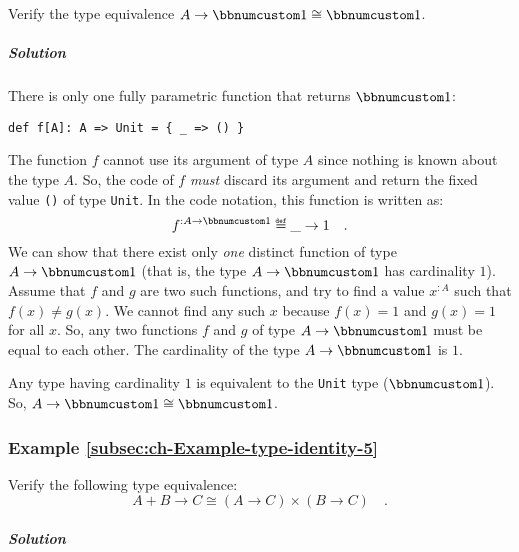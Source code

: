 Verify the type equivalence $A\rightarrow\bbnum 1\cong\bbnum 1$.

\subparagraph{Solution}

There is only one fully parametric function that returns $\bbnum 1$:
\begin{lstlisting}
def f[A]: A => Unit = { _ => () }
\end{lstlisting}
The function $f$ cannot use its argument of type $A$ since nothing
is known about the type $A$. So, the code of $f$ \emph{must} discard
its argument and return the fixed value \lstinline!()! of type \lstinline!Unit!.
In the code notation, this function is written as:
\[
f^{:A\rightarrow\bbnum 1}\triangleq\_\rightarrow1\quad.
\]
We can show that there exist only \emph{one} distinct function of
type $A\rightarrow\bbnum 1$ (that is, the type $A\rightarrow\bbnum 1$
has cardinality $1$). Assume that $f$ and $g$ are two such functions,
and try to find a value $x^{:A}$ such that $f(x)\neq g(x)$. We cannot
find any such $x$ because $f(x)=1$ and $g(x)=1$ for all $x$. So,
any two functions $f$ and $g$ of type $A\rightarrow\bbnum 1$ must
be equal to each other. The cardinality of the type $A\rightarrow\bbnum 1$
is $1$.

Any type having cardinality $1$ is equivalent to the \lstinline!Unit!
type ($\bbnum 1$). So, $A\rightarrow\bbnum 1\cong\bbnum 1$.

\subsubsection{Example \label{subsec:ch-Example-type-identity-5}\ref{subsec:ch-Example-type-identity-5}}

Verify the following type equivalence:
\[
A+B\rightarrow C\cong(A\rightarrow C)\times(B\rightarrow C)\quad.
\]


\subparagraph{Solution}


